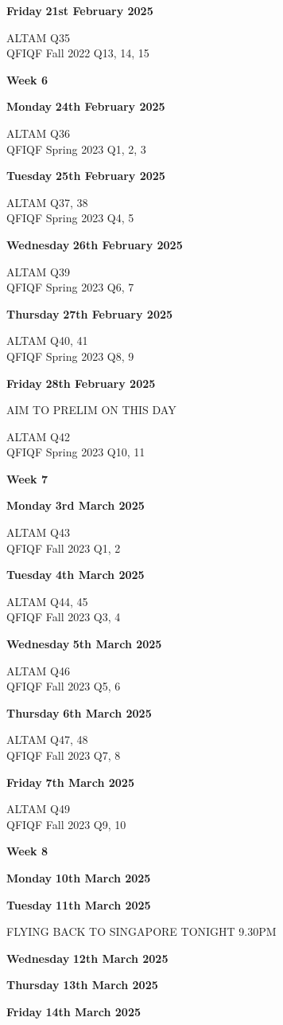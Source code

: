 \documentclass[hidelinks, 12pt]{article}
\theoremstyle{mydefstyle}
\theoremstyle{mythmstyle}
\begin{document}
\textbf{Friday} \hfill \textbf{21st February 2025}

ALTAM Q35 \\
QFIQF Fall 2022 Q13, 14, 15

\begin{center}
\textbf{Week 6}
\end{center}

\textbf{Monday} \hfill \textbf{24th February 2025}

ALTAM Q36 \\
QFIQF Spring 2023 Q1, 2, 3

\textbf{Tuesday} \hfill \textbf{25th February 2025}

ALTAM Q37, 38 \\
QFIQF Spring 2023 Q4, 5

\textbf{Wednesday} \hfill \textbf{26th February 2025}

ALTAM Q39 \\
QFIQF Spring 2023 Q6, 7

\textbf{Thursday} \hfill \textbf{27th February 2025}

ALTAM Q40, 41 \\
QFIQF Spring 2023 Q8, 9

\textbf{Friday} \hfill \textbf{28th February 2025}

AIM TO PRELIM ON THIS DAY

ALTAM Q42 \\
QFIQF Spring 2023 Q10, 11

\begin{center}
\textbf{Week 7}
\end{center}

\textbf{Monday} \hfill \textbf{3rd March 2025}

ALTAM Q43 \\
QFIQF Fall 2023 Q1, 2

\textbf{Tuesday} \hfill \textbf{4th March 2025}

ALTAM Q44, 45 \\
QFIQF Fall 2023 Q3, 4

\textbf{Wednesday} \hfill \textbf{5th March 2025}

ALTAM Q46 \\
QFIQF Fall 2023 Q5, 6

\textbf{Thursday} \hfill \textbf{6th March 2025}

ALTAM Q47, 48 \\
QFIQF Fall 2023 Q7, 8

\textbf{Friday} \hfill \textbf{7th March 2025}

ALTAM Q49 \\
QFIQF Fall 2023 Q9, 10

\begin{center}
\textbf{Week 8}
\end{center}

\textbf{Monday} \hfill \textbf{10th March 2025}

\textbf{Tuesday} \hfill \textbf{11th March 2025}

FLYING BACK TO SINGAPORE TONIGHT 9.30PM

\textbf{Wednesday} \hfill \textbf{12th March 2025}

\textbf{Thursday} \hfill \textbf{13th March 2025}

\textbf{Friday} \hfill \textbf{14th March 2025}
\end{document}
